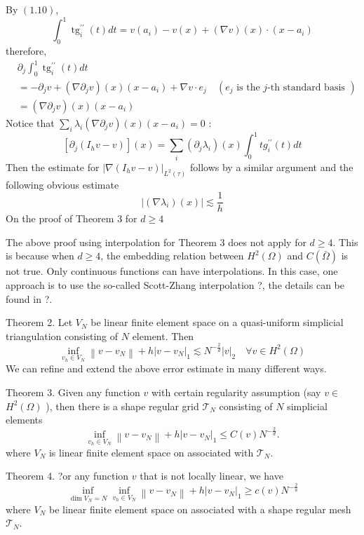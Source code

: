 \documentclass[10pt]{article}
\begin{document}
By $(1.10)$,
$$
\int_{0}^{1} \operatorname{tg}_{i}^{\prime \prime}(t) d t=v\left(a_{i}\right)-v(x)+(\nabla v)(x) \cdot\left(x-a_{i}\right)
$$
therefore,
$$
\begin{aligned}
& \partial_{j} \int_{0}^{1} \operatorname{tg}_{i}^{\prime \prime}(t) d t \\
&=-\partial_{j} v+\left(\nabla \partial_{j} v\right)(x)\left(x-a_{i}\right)+\nabla v \cdot e_{j} \quad\left(e_{j} \text { is the } j \text {-th standard basis }\right) \\
&=\left(\nabla \partial_{j} v\right)(x)\left(x-a_{i}\right)
\end{aligned}
$$
Notice that $\sum_{i} \lambda_{i}\left(\nabla \partial_{j} v\right)(x)\left(x-a_{i}\right)=0$ :
$$
\left[\partial_{j}\left(I_{h} v-v\right)\right](x)=\sum_{i}\left(\partial_{j} \lambda_{i}\right)(x) \int_{0}^{1} t g_{i}^{\prime \prime}(t) d t
$$
Then the estimate for $\left|\nabla\left(I_{h} v-v\right)\right|_{L^{2}(\tau)}$ follows by a similar argument and the following obvious estimate
$$
\left|\left(\nabla \lambda_{i}\right)(x)\right| \lesssim \frac{1}{h}
$$
On the proof of Theorem 3 for $d \geq 4$

The above proof using interpolation for Theorem 3 does not apply for $d \geq 4 .$ This is because when $d \geq 4$, the embedding relation between $H^{2}(\Omega)$ and $C(\bar{\Omega})$ is not true. Only continuous functions can have interpolations. In this case, one approach is to use the so-called Scott-Zhang interpolation ?, the details can be found in ?.

Theorem 2. Let $V_{N}$ be linear finite element space on a quasi-uniform simplicial triangulation consisting of $N$ element. Then
$$
\inf _{v_{h} \in V_{N}}\left\|v-v_{N}\right\|+h\left|v-v_{N}\right|_{1} \lesssim N^{-\frac{2}{d}}|v|_{2} \quad \forall v \in H^{2}(\Omega)
$$
We can refine and extend the above error estimate in many different ways.

Theorem 3. Given any function $v$ with certain regularity assumption (say $v \in$ $H^{2}(\Omega)$ ), then there is a shape regular grid $\mathcal{T}_{N}$ consisting of $N$ simplicial elements
$$
\inf _{v_{h} \in V_{N}}\left\|v-v_{N}\right\|+h\left|v-v_{N}\right|_{1} \leq C(v) N^{-\frac{2}{d}} .
$$
where $V_{N}$ is linear finite element space on associated with $\mathcal{T}_{N} .$

Theorem 4. ?or any function $v$ that is not locally linear, we have
$$
\inf _{\operatorname{dim} V_{N}=N} \inf _{v_{h} \in V_{N}}\left\|v-v_{N}\right\|+h\left|v-v_{N}\right|_{1} \geq c(v) N^{-\frac{2}{a}}
$$
where $V_{N}$ be linear finite element space on associated with a shape regular mesh $\mathcal{T}_{N} .$
\end{document}
